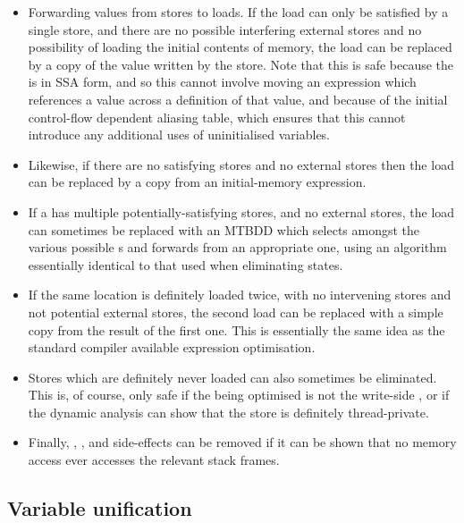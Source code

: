 \begin{itemize}
\item
  Forwarding values from stores to loads.  If the load can only be
  satisfied by a single store, and there are no possible interfering
  external stores and no possibility of loading the initial contents
  of memory, the load can be replaced by a copy of the value written
  by the store.  Note that this is safe because the {\StateMachine} is
  in SSA form, and so this cannot involve moving an expression which
  references a value across a definition of that value, and because of
  the initial control-flow dependent aliasing table, which ensures
  that this cannot introduce any additional uses of uninitialised
  variables.
\item
  Likewise, if there are no satisfying stores and no external stores
  then the load can be replaced by a copy from an initial-memory
  expression.
\item
  If a  has multiple potentially-satisfying stores, and no
  external stores, the load can sometimes be replaced with an MTBDD
  which selects amongst the various possible s and
  forwards from an appropriate one, using an algorithm essentially
  identical to that used when eliminating \state{$\Phi$} states.
\item
  If the same location is definitely loaded twice, with no intervening
  stores and not potential external stores, the second load can be
  replaced with a simple copy from the result of the first one.  This
  is essentially the same idea as the standard compiler available
  expression\needCite{} optimisation.
\item
  Stores which are definitely never loaded can also sometimes be
  eliminated.  This is, of course, only safe if the {\StateMachine}
  being optimised is not the write-side {\StateMachine}, or if the
  dynamic analysis can show that the store is definitely
  thread-private.
\item
  Finally, , , and
   side-effects can be removed if it can be shown
  that no memory access ever accesses the relevant stack frames.
\end{itemize}

\subsection{Variable unification}
\label{sect:unification}


